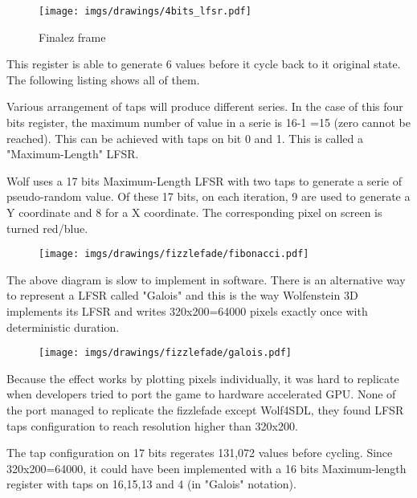 \begin{figure}[H]
 \centering
  \texttt{[image: imgs/drawings/4bits\_lfsr.pdf]}
 \caption{Finalez frame} 
\end{figure}
This register is able to generate 6 values before it cycle back to it original state. The following listing shows all of them.\\
\par
\begin{minipage}{\textwidth}

\end{minipage}
\par
Various arrangement of taps will produce different series. In the case of this four bits register, the maximum number of value in a serie is 16-1 =15 (zero cannot be reached). This can be achieved with taps on bit 0 and 1. This is called a "Maximum-Length" LFSR.\\
\par
\begin{minipage}{\textwidth}

\end{minipage}
\par
\par
Wolf uses a 17 bits Maximum-Length LFSR with two taps to generate a serie of pseudo-random value. Of these 17 bits, on each iteration, 9 are used to generate a Y coordinate and 8 for a X coordinate. The corresponding pixel on screen is turned red/blue.\\
\par
\begin{figure}[H] \centering \texttt{[image: imgs/drawings/fizzlefade/fibonacci.pdf]} \end{figure}
\par
The above diagram is slow to implement in software. There is an alternative way to represent a LFSR called "Galois" and this is the way Wolfenstein 3D implements its LFSR and writes 320x200=64000 pixels exactly once with deterministic duration.
\par
\begin{figure}[H] \centering \texttt{[image: imgs/drawings/fizzlefade/galois.pdf]} \end{figure}
      
 Because the effect works by plotting pixels individually, it was hard to replicate when developers tried to port the game to hardware accelerated GPU. None of the port managed to replicate the fizzlefade except Wolf4SDL, they found LFSR taps configuration to reach resolution higher than 320x200.\\
\par
{} The tap configuration on 17 bits regerates 131,072 values before cycling. Since 320x200=64000, it could have been implemented with a 16 bits Maximum-length register with taps on 16,15,13 and 4 (in "Galois" notation).










